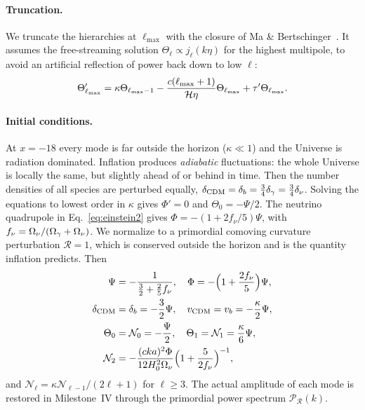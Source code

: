 \paragraph*{Truncation.} We truncate the hierarchies at $\ell_{\max}$ with the closure of Ma \&
Bertschinger~\cite{Ma1995}. It assumes the free-streaming solution $\Theta_\ell\propto j_\ell(k\eta)$ for the highest
multipole, to avoid an artificial reflection of power back down to low $\ell$:
\begin{equation}
\Theta_{\ell_{\max}}' = \kappa\Theta_{\ell_{\max}-1} - \frac{c(\ell_{\max}+1)}{\mathcal{H}\eta}\Theta_{\ell_{\max}}
+\tau'\Theta_{\ell_{\max}}.
\end{equation}

\paragraph*{Initial conditions.} At $x=-18$ every mode is far outside the horizon ($\kappa\ll1$) and the Universe is
radiation dominated. Inflation produces \emph{adiabatic} fluctuations: the whole Universe is locally the same, but
slightly ahead of or behind in time. Then the number densities of all species are perturbed equally,
$\delta_{\rm CDM}=\delta_b=\tfrac34\delta_\gamma=\tfrac34\delta_\nu$. Solving the equations to lowest order in $\kappa$
gives $\Phi'=0$ and $\Theta_0=-\Psi/2$. The neutrino quadrupole in Eq.~\eqref{eq:einstein2} gives
$\Phi=-(1+2f_\nu/5)\Psi$, with $f_\nu=\Omega_\nu/(\Omega_\gamma+\Omega_\nu)$. We normalize to a primordial comoving curvature
perturbation $\mathcal{R}=1$, which is conserved outside the horizon and is the quantity inflation predicts. Then
\begin{align}
\Psi &= -\frac{1}{\tfrac32+\tfrac25f_\nu}, \quad \Phi = -\Big(1+\frac{2f_\nu}{5}\Big)\Psi, \nonumber\\
\delta_{\rm CDM} &=\delta_b=-\frac32\Psi,\quad v_{\rm CDM} = v_b = -\frac{\kappa}{2}\Psi, \nonumber\\
\Theta_0 &=\mathcal{N}_0=-\frac{\Psi}{2},\quad \Theta_1=\mathcal{N}_1=\frac{\kappa}{6}\Psi, \nonumber\\
\mathcal{N}_2 &= -\frac{(cka)^2\Phi}{12H_0^2\Omega_\nu}\Big(1+\frac{5}{2f_\nu}\Big)^{-1},
\end{align}
and $\mathcal{N}_\ell=\kappa\mathcal{N}_{\ell-1}/(2\ell+1)$ for $\ell\ge3$. The actual amplitude of each mode is
restored in Milestone~IV through the primordial power spectrum $\mathcal{P}_{\mathcal{R}}(k)$.

